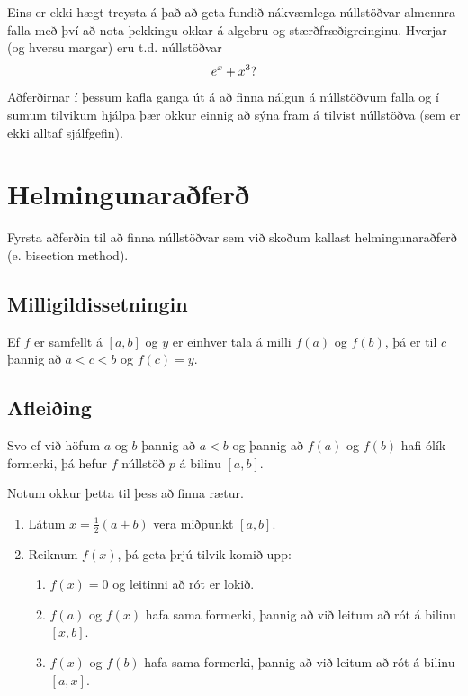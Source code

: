 \documentclass[A4paper,10pt,icelandic]{sphinxmanual}
\begin{document}
Eins er ekki hægt treysta á það að geta fundið nákvæmlega núllstöðvar almennra falla með því
að nota þekkingu okkar á algebru og stærðfræðigreinginu. Hverjar (og hversu margar) eru t.d. núllstöðvar
\begin{gather}
\begin{split}e^x + x^3?\end{split}\notag
\end{gather}
Aðferðirnar í þessum kafla ganga út á að finna nálgun á núllstöðvum falla og í sumum tilvikum
hjálpa þær okkur einnig að sýna fram á tilvist núllstöðva (sem er ekki alltaf sjálfgefin).


\section{Helmingunaraðferð}
\label{kafli02:helmingunarafer}
Fyrsta aðferðin til að finna núllstöðvar sem við skoðum kallast
helmingunaraðferð (e. bisection method).


\subsection{Milligildissetningin}
\label{kafli02:milligildissetningin}
Ef \(f\) er samfellt á \([a,b]\) og \(y\) er einhver
tala á milli \(f(a)\) og \(f(b)\), þá er til \(c\)
þannig að \(a < c < b\) og \(f(c) = y\).


\subsection{Afleiðing}
\label{kafli02:afleiing}
Svo ef við höfum \(a\) og \(b\) þannig að \(a < b\) og
þannig að \(f(a)\) og \(f(b)\) hafi ólík formerki, þá hefur
\(f\) núllstöð \(p\) á bilinu \([a,b]\).

Notum okkur þetta til þess að finna rætur.
\begin{enumerate}
\item {} 
Látum \(x = \frac 12(a+b)\) vera miðpunkt \([a,b]\).

\item {} 
Reiknum \(f(x)\), þá geta þrjú tilvik komið upp:
\begin{enumerate}
\item {} 
\(f(x) = 0\) og leitinni að rót er lokið.

\item {} 
\(f(a)\) og \(f(x)\) hafa sama formerki, þannig að við
leitum að rót á bilinu \([x,b]\).

\item {} 
\(f(x)\) og \(f(b)\) hafa sama formerki, þannig að við
leitum að rót á bilinu \([a,x]\).

\end{enumerate}

\end{enumerate}
\end{document}
